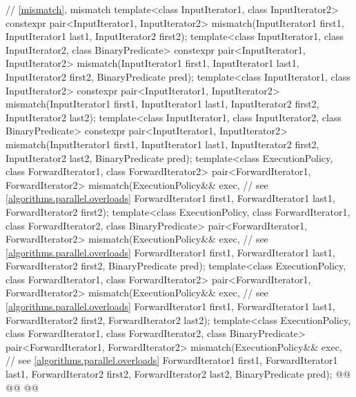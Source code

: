 \begin{codeblock}
{  // \ref{mismatch}, mismatch
  template<class InputIterator1, class InputIterator2>
    constexpr pair<InputIterator1, InputIterator2>
      mismatch(InputIterator1 first1, InputIterator1 last1,
               InputIterator2 first2);
  template<class InputIterator1, class InputIterator2, class BinaryPredicate>
    constexpr pair<InputIterator1, InputIterator2>
      mismatch(InputIterator1 first1, InputIterator1 last1,
               InputIterator2 first2, BinaryPredicate pred);
  template<class InputIterator1, class InputIterator2>
    constexpr pair<InputIterator1, InputIterator2>
      mismatch(InputIterator1 first1, InputIterator1 last1,
               InputIterator2 first2, InputIterator2 last2);
  template<class InputIterator1, class InputIterator2, class BinaryPredicate>
    constexpr pair<InputIterator1, InputIterator2>
      mismatch(InputIterator1 first1, InputIterator1 last1,
               InputIterator2 first2, InputIterator2 last2,
               BinaryPredicate pred);
  template<class ExecutionPolicy, class ForwardIterator1, class ForwardIterator2>
    pair<ForwardIterator1, ForwardIterator2>
      mismatch(ExecutionPolicy&& exec, // see \ref{algorithms.parallel.overloads}
               ForwardIterator1 first1, ForwardIterator1 last1,
               ForwardIterator2 first2);
  template<class ExecutionPolicy, class ForwardIterator1, class ForwardIterator2,
           class BinaryPredicate>
    pair<ForwardIterator1, ForwardIterator2>
      mismatch(ExecutionPolicy&& exec, // see \ref{algorithms.parallel.overloads}
               ForwardIterator1 first1, ForwardIterator1 last1,
               ForwardIterator2 first2, BinaryPredicate pred);
  template<class ExecutionPolicy, class ForwardIterator1, class ForwardIterator2>
    pair<ForwardIterator1, ForwardIterator2>
      mismatch(ExecutionPolicy&& exec, // see \ref{algorithms.parallel.overloads}
               ForwardIterator1 first1, ForwardIterator1 last1,
               ForwardIterator2 first2, ForwardIterator2 last2);
  template<class ExecutionPolicy, class ForwardIterator1, class ForwardIterator2,
           class BinaryPredicate>
    pair<ForwardIterator1, ForwardIterator2>
      mismatch(ExecutionPolicy&& exec, // see \ref{algorithms.parallel.overloads}
               ForwardIterator1 first1, ForwardIterator1 last1,
               ForwardIterator2 first2, ForwardIterator2 last2,
               BinaryPredicate pred);
  @@
    @@
        @@
}
\end{codeblock}
